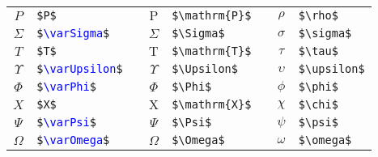 \begin{table}[h]
\begin{tabular}{c p{15ex} p{5ex} c p{15ex} p{5ex} c p{15ex}}
	$P$           & \verb|$P$|                                               &&
	$\mathrm{P}$  & \verb|$\mathrm{P}$|                                      &&
	$\rho$        & \verb|$\rho$|                                            \\

	$\varSigma$   & \texttt{\$\textcolor{blue}{\textbackslash varSigma}\$}   &&
	$\Sigma$      & \verb|$\Sigma$|                                          &&
	$\sigma$      & \verb|$\sigma$|                                          \\

	$T$           & \verb|$T$|                                               &&
	$\mathrm{T}$  & \verb|$\mathrm{T}$|                                      &&
	$\tau$        & \verb|$\tau$|                                            \\

	$\varUpsilon$ & \texttt{\$\textcolor{blue}{\textbackslash varUpsilon}\$} &&
	$\Upsilon$    & \verb|$\Upsilon$|                                        &&
	$\upsilon$    & \verb|$\upsilon$|                                        \\

	$\varPhi$     & \texttt{\$\textcolor{blue}{\textbackslash varPhi}\$}     &&
	$\Phi$        & \verb|$\Phi$|                                            &&
	$\phi$        & \verb|$\phi$|                                            \\

	$X$           & \verb|$X$|                                               &&
	$\mathrm{X}$  & \verb|$\mathrm{X}$|                                      &&
	$\chi$        & \verb|$\chi$|                                            \\

	$\varPsi$     & \texttt{\$\textcolor{blue}{\textbackslash varPsi}\$}     &&
	$\Psi$        & \verb|$\Psi$|                                            &&
	$\psi$        & \verb|$\psi$|                                            \\

	$\varOmega$   & \texttt{\$\textcolor{blue}{\textbackslash varOmega}\$}   &&
	$\Omega$      & \verb|$\Omega$|                                          &&
	$\omega$      & \verb|$\omega$|                                          \\

	\hline
\end{tabular}
\end{table}

